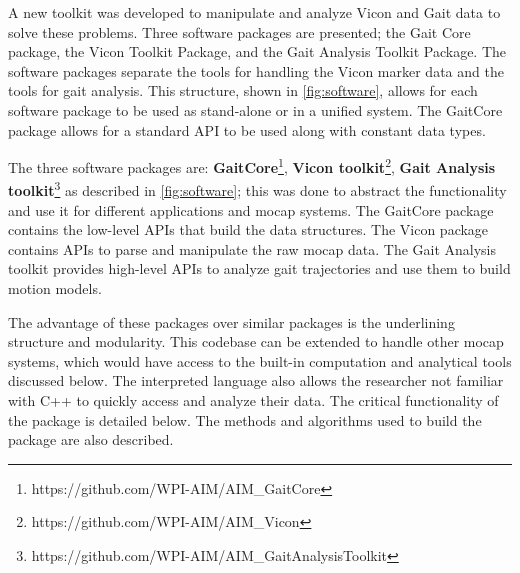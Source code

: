 A new toolkit was developed to manipulate and analyze Vicon and Gait data to solve these problems. Three software packages are presented; the Gait Core package, the Vicon Toolkit Package, and the Gait Analysis Toolkit Package. The software packages separate the tools for handling the Vicon marker data and the tools for gait analysis. This structure, shown in \autoref{fig:software}, allows for each software package to be used as stand-alone or in a unified system. The GaitCore package allows for a standard API to be used along with constant data types.   

The three software packages are: 
 \textbf{GaitCore}\footnote{https://github.com/WPI-AIM/AIM\_GaitCore}, \textbf{Vicon toolkit}\footnote{https://github.com/WPI-AIM/AIM\_Vicon},  \textbf{Gait Analysis toolkit}\footnote{https://github.com/WPI-AIM/AIM\_GaitAnalysisToolkit} as described in \autoref{fig:software}; this was done to abstract the functionality and use it for different applications and mocap systems. The GaitCore package contains the low-level APIs that build the data structures. The Vicon package contains APIs to parse and manipulate the raw mocap data. The Gait Analysis toolkit provides high-level APIs to analyze gait trajectories and use them to build motion models. 

The advantage of these packages over similar packages is the underlining structure and modularity. This codebase can be extended to handle other mocap systems, which would have access to the built-in computation and analytical tools discussed below. The interpreted language also allows the researcher not familiar with C++ to quickly access and analyze their data. The critical functionality of the package is detailed below. The methods and algorithms used to build the package are also described. 




